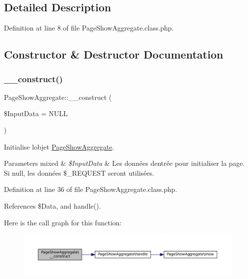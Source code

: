 \subsection{Detailed Description}


Definition at line 8 of file Page\+Show\+Aggregate.\+class.\+php.



\subsection{Constructor \& Destructor Documentation}
\mbox{\label{class_page_show_aggregate_a3e1094f868d001337de44b7d7feeb51f}} 
\subsubsection{\texorpdfstring{\+\_\+\+\_\+construct()}{\_\_construct()}}
{\footnotesize\ttfamily Page\+Show\+Aggregate\+::\+\_\+\+\_\+construct (\begin{DoxyParamCaption}\item[{}]{\$\+Input\+Data = {\ttfamily NULL} }\end{DoxyParamCaption})}

Initialise l\textquotesingle{}objet \hyperlink{class_page_show_aggregate}{Page\+Show\+Aggregate}.


\begin{DoxyParams}[1]{Parameters}
mixed & {\em \$\+Input\+Data} & Les données d\textquotesingle{}entrée pour initialiser la page. Si null, les données \$\+\_\+\+R\+E\+Q\+U\+E\+ST seront utilisées. \\
\hline
\end{DoxyParams}


Definition at line 36 of file Page\+Show\+Aggregate.\+class.\+php.



References \$\+Data, and handle().

Here is the call graph for this function\+:\nopagebreak
\begin{figure}[H]
\begin{center}
\leavevmode
\includegraphics[width=350pt]{class_page_show_aggregate_a3e1094f868d001337de44b7d7feeb51f_cgraph}
\end{center}
\end{figure}


